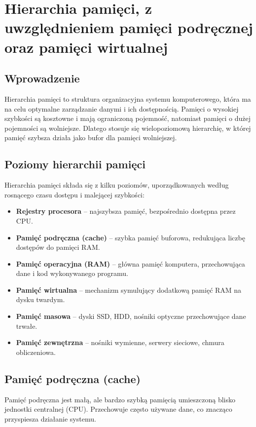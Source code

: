 \section{Hierarchia pamięci, z uwzględnieniem pamięci podręcznej oraz pamięci wirtualnej}

\subsection{Wprowadzenie}
Hierarchia pamięci to struktura organizacyjna systemu komputerowego, która ma na celu optymalne zarządzanie danymi i ich dostępnością. Pamięci o wysokiej szybkości są kosztowne i mają ograniczoną pojemność, natomiast pamięci o dużej pojemności są wolniejsze. Dlatego stosuje się wielopoziomową hierarchię, w której pamięć szybsza działa jako bufor dla pamięci wolniejszej.

\subsection{Poziomy hierarchii pamięci}
Hierarchia pamięci składa się z kilku poziomów, uporządkowanych według rosnącego czasu dostępu i malejącej szybkości:

\begin{itemize}
    \item \textbf{Rejestry procesora} – najszybsza pamięć, bezpośrednio dostępna przez CPU.
    \item \textbf{Pamięć podręczna (cache)} – szybka pamięć buforowa, redukująca liczbę dostępów do pamięci RAM.
    \item \textbf{Pamięć operacyjna (RAM)} – główna pamięć komputera, przechowująca dane i kod wykonywanego programu.
    \item \textbf{Pamięć wirtualna} – mechanizm symulujący dodatkową pamięć RAM na dysku twardym.
    \item \textbf{Pamięć masowa} – dyski SSD, HDD, nośniki optyczne przechowujące dane trwałe.
    \item \textbf{Pamięć zewnętrzna} – nośniki wymienne, serwery sieciowe, chmura obliczeniowa.
\end{itemize}

\subsection{Pamięć podręczna (cache)}
Pamięć podręczna jest małą, ale bardzo szybką pamięcią umieszczoną blisko jednostki centralnej (CPU). Przechowuje często używane dane, co znacząco przyspiesza działanie systemu.

